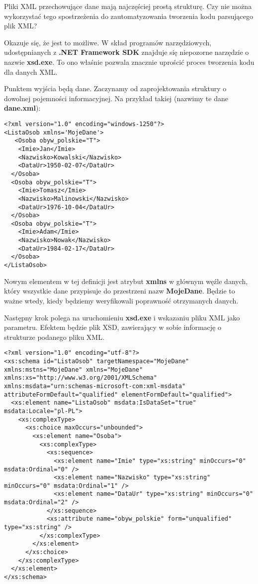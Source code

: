 Pliki XML przechowujące dane mają najczęściej prostą strukturę. Czy nie można wykorzystać tego
spostrzeżenia do zautomatyzowania tworzenia kodu parsującego plik XML?

Okazuje się, że jest to możliwe. W skład programów narzędziowych, udostępnianych z {\bf .NET Framework SDK}
znajduje się niepozorne narzędzie o nazwie {\bf xsd.exe}. To ono właśnie pozwala znacznie uprościć
proces tworzenia kodu dla danych XML. 

Punktem wyjścia będą dane. Zaczynamy od zaprojektowania struktury o dowolnej pojemności informacyjnej. 
Na przykład takiej (nazwimy te dane {\bf dane.xml}):

\begin{scriptsize}
\begin{verbatim}
<?xml version="1.0" encoding="windows-1250"?>
<ListaOsob xmlns='MojeDane'>
   <Osoba obyw_polskie="T">
    <Imie>Jan</Imie>
    <Nazwisko>Kowalski</Nazwisko>
    <DataUr>1950-02-07</DataUr>
  </Osoba>
  <Osoba obyw_polskie="T">
    <Imie>Tomasz</Imie>
    <Nazwisko>Malinowski</Nazwisko>
    <DataUr>1976-10-04</DataUr>
  </Osoba>
  <Osoba obyw_polskie="T">
    <Imie>Adam</Imie>
    <Nazwisko>Nowak</Nazwisko>
    <DataUr>1984-02-17</DataUr>
  </Osoba>
</ListaOsob>
\end{verbatim}
\end{scriptsize}

Nowym elementem w tej definicji jest atrybut {\bf xmlns} w głównym węźle danych, który wszystkie dane
przypisuje do przestrzeni nazw {\bf MojeDane}. Będzie to ważne wtedy, kiedy będziemy weryfikowali poprawność
otrzymanych danych.

Następny krok polega na uruchomieniu {\bf xsd.exe} i wskazaniu pliku XML jako parametru. Efektem będzie plik 
XSD, zawierający w sobie informację o strukturze podanego pliku XML.

\begin{scriptsize}
\begin{verbatim}
<?xml version="1.0" encoding="utf-8"?>
<xs:schema id="ListaOsob" targetNamespace="MojeDane" 
xmlns:mstns="MojeDane" xmlns="MojeDane" xmlns:xs="http://www.w3.org/2001/XMLSchema" 
xmlns:msdata="urn:schemas-microsoft-com:xml-msdata" 
attributeFormDefault="qualified" elementFormDefault="qualified">
  <xs:element name="ListaOsob" msdata:IsDataSet="true" msdata:Locale="pl-PL">
    <xs:complexType>
      <xs:choice maxOccurs="unbounded">
        <xs:element name="Osoba">
          <xs:complexType>
            <xs:sequence>
              <xs:element name="Imie" type="xs:string" minOccurs="0" msdata:Ordinal="0" />
              <xs:element name="Nazwisko" type="xs:string" minOccurs="0" msdata:Ordinal="1" />
              <xs:element name="DataUr" type="xs:string" minOccurs="0" msdata:Ordinal="2" />
            </xs:sequence>
            <xs:attribute name="obyw_polskie" form="unqualified" type="xs:string" />
          </xs:complexType>
        </xs:element>
      </xs:choice>
    </xs:complexType>
  </xs:element>
</xs:schema>
\end{verbatim}
\end{scriptsize}

